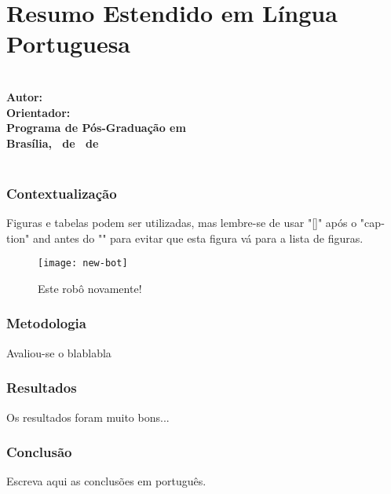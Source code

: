 \chapter{Resumo Estendido em Língua Portuguesa}\label{appendix:pt_estendido}
\begin{singlespace}
{\setfonttimes\normalsize{}}\\
{\setfonttimes\normalsize{\textbf{Autor:} \autorinome}}\\
{\setfonttimes\normalsize{\textbf{Orientador:} \orientadornome}}\\
{\setfonttimes\normalsize{\textbf{Programa de Pós-Graduação em \programadoaluno}}\\}
{\setfonttimes\normalsize{\textbf{Bras\'ilia, \dianome\ de \MakeLowercase{\mesnome}\ de \anonome}}\\\\}
{\setfonttimes\normalsize{}}
\end{singlespace}
\vspace{-5mm}
\begin{otherlanguage}{portuguese}
\subsection*{Contextualização}
Figuras e tabelas podem ser utilizadas, mas lembre-se de usar "[]" após o "caption" and antes do "{}" para evitar que esta figura vá para a lista de figuras.

\begin{figure}[H]
	\centering %
	\scriptsize %
	\texttt{[image: new-bot]}
	\caption[]{Este robô novamente!}
	\label{fig:appendix_oldbot}
\end{figure}
\subsection*{Metodologia}
Avaliou-se o blablabla
\subsection*{Resultados}
Os resultados foram muito bons...
\subsection*{Conclusão}
Escreva aqui as conclusões em português.
\end{otherlanguage}